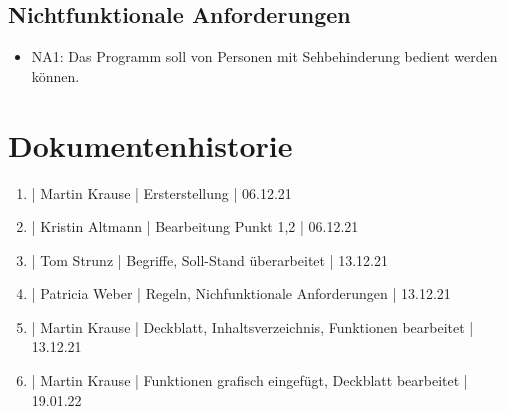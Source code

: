 \documentclass[12pt]{scrartcl}
\begin{document}
\subsection{Nichtfunktionale Anforderungen}

\begin{itemize}
	\item NA1: Das Programm soll von Personen mit Sehbehinderung bedient werden können.
\end{itemize}

\section{Dokumentenhistorie}

\begin{enumerate}
	\item | Martin Krause | Ersterstellung | 06.12.21
	\item | Kristin Altmann | Bearbeitung Punkt 1,2  | 06.12.21
	\item | Tom Strunz | Begriffe, Soll-Stand überarbeitet | 13.12.21
	\item | Patricia Weber | Regeln, Nichfunktionale Anforderungen | 13.12.21
	\item | Martin Krause | Deckblatt, Inhaltsverzeichnis, Funktionen bearbeitet | 13.12.21
	\item | Martin Krause | Funktionen grafisch eingefügt, Deckblatt bearbeitet | 19.01.22
\end{enumerate}
 
\end{document}
